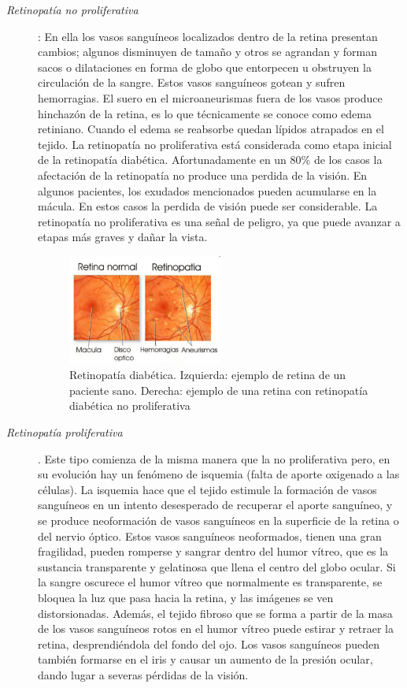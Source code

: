 \begin{description}
\begin{description}
	\item[\normalfont\textit{Retinopat\'ia no proliferativa}] : En ella los vasos sangu\'ineos localizados dentro de la retina presentan cambios; algunos disminuyen de tamaño y otros se agrandan y forman sacos o dilataciones en forma de globo que entorpecen u obstruyen la circulaci\'on de la sangre. Estos vasos sangu\'ineos gotean y sufren hemorragias. El suero en el microaneurismas fuera de los vasos produce hinchaz\'on de la retina, es lo que t\'ecnicamente se conoce como edema retiniano. Cuando el edema se reabsorbe quedan l\'ipidos atrapados en el tejido.
La retinopatía no proliferativa est\'a considerada como etapa inicial de la retinopat\'ia diab\'etica. Afortunadamente en un 80\% de los casos la afectaci\'on de la retinopatía no produce una perdida de la visi\'on. En algunos pacientes, los exudados mencionados pueden acumularse en la m\'acula. En estos casos la perdida de visi\'on puede ser considerable. La retinopat\'ia no proliferativa es una señal de peligro, ya que puede avanzar a etapas m\'as graves y dañar la vista.
\begin{figure}[H]
	{
	\centering
	\includegraphics[width=0.5\textwidth]{Figures/Retinopatia}
	\caption[Retinopat\'ia]{Retinopat\'ia diab\'etica. Izquierda: ejemplo de retina de un paciente sano. Derecha: ejemplo de una retina con retinopat\'ia diab\'etica no proliferativa}
	\label{fig:Retinopatia}
	}
\end{figure}
\item[\normalfont\textit{ Retinopat\'ia proliferativa}]. Este tipo comienza de la misma manera que la no proliferativa pero, en su evoluci\'on hay un fen\'omeno de isquemia (falta de aporte oxigenado a las c\'elulas). La isquemia hace que el tejido estimule la formaci\'on de vasos sangu\'ineos en un intento desesperado de recuperar el aporte sangu\'ineo, y se produce neoformaci\'on de vasos sangu\'ineos en la superficie de la retina o del nervio \'optico. Estos vasos sangu\'ineos neoformados, tienen una gran fragilidad, pueden romperse y sangrar dentro del humor v\'itreo, que es la sustancia transparente y gelatinosa que llena el centro del globo ocular. Si la sangre oscurece el humor v\'itreo que normalmente es transparente, se bloquea la luz que pasa hacia la retina, y las im\'agenes se ven distorsionadas. Adem\'as, el tejido fibroso que se forma a partir de la masa de los vasos sangu\'ineos rotos en el humor v\'itreo puede estirar y retraer la retina, desprendi\'endola del fondo del ojo. Los vasos sangu\'ineos pueden tambi\'en formarse en el iris y causar un aumento de la presi\'on ocular, dando lugar a severas p\'erdidas de la visi\'on.

\end{description}
\end{description}
